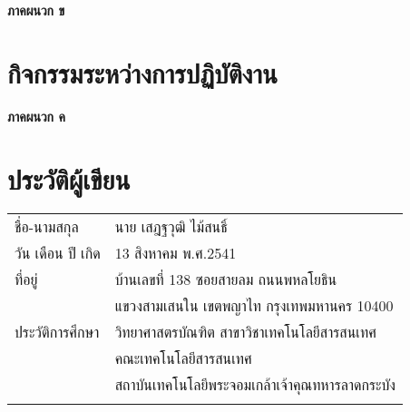 \clearpage 
\thispagestyle{empty}
\begin{center}
	\LARGE{\textbf{ภาคผนวก ข}}
\end{center}

\chapter{กิจกรรมระหว่างการปฏิบัติงาน}

\clearpage 
\thispagestyle{empty}
\begin{center}
	\LARGE{\textbf{ภาคผนวก ค}}
\end{center}

\chapter{ประวัติผู้เขียน}
\begin{tabularx}{\linewidth}{lX}
	ชื่อ-นามสกุล&นาย เสฎฐวุฒิ ไม้สนธิ์\\
	วัน เดือน ปี เกิด&13 สิงหาคม พ.ศ.2541\\
	ที่อยู่& บ้านเลขที่ 138 ซอยสายลม ถนนพหลโยธิน 
	\\
	&แขวงสามเสนใน เขตพญาไท กรุงเทพมหานคร 10400
	\\
	ประวัติการศึกษา&วิทยาศาสตรบัณฑิต สาขาวิชาเทคโนโลยีสารสนเทศ
	\\
	&คณะเทคโนโลยีสารสนเทศ
	\\
	&สถาบันเทคโนโลยีพระจอมเกล้าเจ้าคุณทหารลาดกระบัง
	\\
	\\
\end{tabularx}